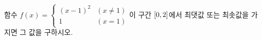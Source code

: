 함수 $f(x)=\begin{cases} (x-1)^2 & (x\ne 1) \\ 1 & (x=1) \end{cases}$이 구간 $[0{,}\mkern3mu\mathopen{}2]$에서 최댓값 또는 최솟값을 가지면 그 값을 구하시오.
